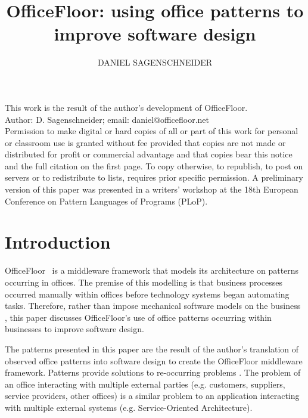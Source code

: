\documentclass[prodmode]{style/acmlarge}
\title{OfficeFloor: using office patterns to improve software design}
\author{DANIEL SAGENSCHNEIDER \affil{OfficeFloor, daniel@officefloor.net}}
\begin{document}
\graphicspath{{./pdf/}}

\lstset{language=Java}

\captionsetup[lstlisting]{font=footnotesize}


\begin{bottomstuff}
This work is the result of the author's development of OfficeFloor.\\
Author: D. Sagenschneider; email: daniel@officefloor.net\\

Permission to make digital or hard copies of all or part of this work for
personal or classroom use is granted without fee provided that copies are not
made or distributed for profit or commercial advantage and that copies bear this
notice and the full citation on the first page. To copy otherwise, to republish,
to post on servers or to redistribute to lists, requires prior specific
permission. A preliminary version of this paper was presented in a writers'
workshop at the 18th European Conference on Pattern Languages of Programs
(PLoP).
\end{bottomstuff}

\maketitle




\section{Introduction}

OfficeFloor~\cite{officefloor} is a middleware framework that models its
architecture on patterns occurring in offices.  The premise of this modelling is
that business processes occurred manually within offices before technology
systems began automating tasks.  Therefore, rather than impose mechanical
software models on the business
\cite{enterprise-process-modelling,model-business-process,model-sociotechnical},
this paper discusses OfficeFloor's use of office patterns occurring within
businesses to improve software design.

The patterns presented in this paper are the result of the author's translation
of observed office patterns into software design to create the OfficeFloor
middleware framework.  Patterns provide solutions to re-occurring problems
\cite{pattern-language}.  The problem of an office interacting with multiple
external parties (e.g. customers, suppliers, service providers, other offices)
is a similar problem to an application interacting with multiple external
systems (e.g. Service-Oriented Architecture).
\end{document}
